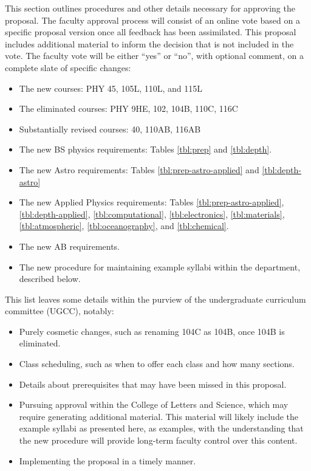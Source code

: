 \documentclass[12pt]{article}
\begin{document}
This section outlines procedures and other details necessary for
approving the proposal.  The faculty approval process will consist of
an online vote based on a specific proposal version once all feedback
has been assimilated.  This proposal includes additional material to
inform the decision that is not included in the vote.  The faculty
vote will be either ``yes'' or ``no'', with optional comment, on a
complete slate of specific changes:
\begin{itemize}
 \item The new courses: PHY 45, 105L, 110L, and 115L
 \item The eliminated courses:  PHY 9HE, 102, 104B, 110C, 116C
 \item Substantially revised courses: 40, 110AB, 116AB
 \item The new BS physics requirements: Tables \ref{tbl:prep} and \ref{tbl:depth}.
 \item The new Astro requirements: Tables \ref{tbl:prep-astro-applied} and \ref{tbl:depth-astro}   
 \item The new Applied Physics requirements: Tables \ref{tbl:prep-astro-applied},\ref{tbl:depth-applied},
\ref{tbl:computational}, \ref{tbl:electronics}, \ref{tbl:materials}, \ref{tbl:atmospheric}, \ref{tbl:oceanography}, and \ref{tbl:chemical}.   
 \item The new AB requirements.
 \item The new procedure for maintaining example syllabi within the department, described below.
\end{itemize}
This list leaves some details within the purview of the undergraduate
curriculum committee (UGCC), notably:
\begin{itemize}
 \item Purely cosmetic changes, such as renaming 104C as 104B, once 104B is eliminated.
 \item Class scheduling, such as when to offer each class and how many sections.
 \item Details about prerequisites that may have been missed in this proposal.
 \item Pursuing approval within the College of Letters and Science, which may require
   generating additional material.  This material will likely include
   the example syllabi as presented here, as examples, with the
   understanding that the new procedure will provide long-term faculty
   control over this content.
 \item Implementing the proposal in a timely manner.
\end{itemize}
\end{document}

